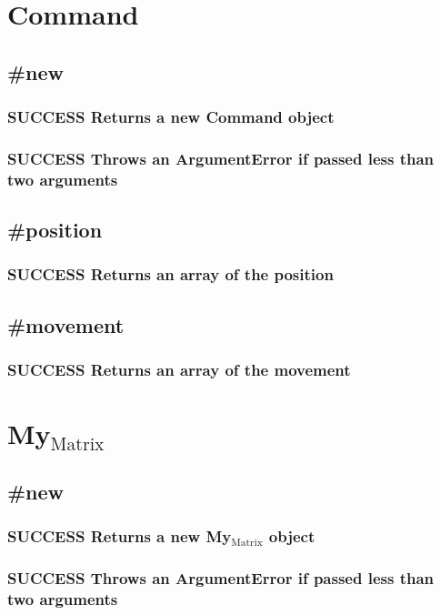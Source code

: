 \documentclass{article}
\begin{document}
\section{Command}
\label{sec-5}
\subsection{\#new}
\label{sec-5-1}
\subsubsection{\textbf{SUCCESS} Returns a new Command object}
\label{sec-5-1-1}
\subsubsection{\textbf{SUCCESS} Throws an ArgumentError if passed less than two arguments}
\label{sec-5-1-2}
\subsection{\#position}
\label{sec-5-2}
\subsubsection{\textbf{SUCCESS} Returns an array of the position}
\label{sec-5-2-1}
\subsection{\#movement}
\label{sec-5-3}
\subsubsection{\textbf{SUCCESS} Returns an array of the movement}
\label{sec-5-3-1}
\section{My$_{\mathrm{Matrix}}$}
\label{sec-6}
\subsection{\#new}
\label{sec-6-1}
\subsubsection{\textbf{SUCCESS} Returns a new My$_{\mathrm{Matrix}}$ object}
\label{sec-6-1-1}
\subsubsection{\textbf{SUCCESS} Throws an ArgumentError if passed less than two arguments}
\label{sec-6-1-2}
\end{document}
